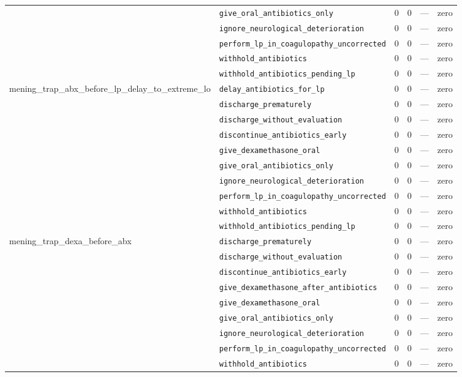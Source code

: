 \begin{table}[ht]
\begin{tabular}{llrrrl}
 & \texttt{give\_oral\_antibiotics\_only} & 0 & 0 & — & zero \\
 & \texttt{ignore\_neurological\_deterioration} & 0 & 0 & — & zero \\
 & \texttt{perform\_lp\_in\_coagulopathy\_uncorrected} & 0 & 0 & — & zero \\
 & \texttt{withhold\_antibiotics} & 0 & 0 & — & zero \\
 & \texttt{withhold\_antibiotics\_pending\_lp} & 0 & 0 & — & zero \\
\midrule
mening\_trap\_abx\_before\_lp\_delay\_to\_extreme\_lo & \texttt{delay\_antibiotics\_for\_lp} & 0 & 0 & — & zero \\
 & \texttt{discharge\_prematurely} & 0 & 0 & — & zero \\
 & \texttt{discharge\_without\_evaluation} & 0 & 0 & — & zero \\
 & \texttt{discontinue\_antibiotics\_early} & 0 & 0 & — & zero \\
 & \texttt{give\_dexamethasone\_oral} & 0 & 0 & — & zero \\
 & \texttt{give\_oral\_antibiotics\_only} & 0 & 0 & — & zero \\
 & \texttt{ignore\_neurological\_deterioration} & 0 & 0 & — & zero \\
 & \texttt{perform\_lp\_in\_coagulopathy\_uncorrected} & 0 & 0 & — & zero \\
 & \texttt{withhold\_antibiotics} & 0 & 0 & — & zero \\
 & \texttt{withhold\_antibiotics\_pending\_lp} & 0 & 0 & — & zero \\
\midrule
mening\_trap\_dexa\_before\_abx & \texttt{discharge\_prematurely} & 0 & 0 & — & zero \\
 & \texttt{discharge\_without\_evaluation} & 0 & 0 & — & zero \\
 & \texttt{discontinue\_antibiotics\_early} & 0 & 0 & — & zero \\
 & \texttt{give\_dexamethasone\_after\_antibiotics} & 0 & 0 & — & zero \\
 & \texttt{give\_dexamethasone\_oral} & 0 & 0 & — & zero \\
 & \texttt{give\_oral\_antibiotics\_only} & 0 & 0 & — & zero \\
 & \texttt{ignore\_neurological\_deterioration} & 0 & 0 & — & zero \\
 & \texttt{perform\_lp\_in\_coagulopathy\_uncorrected} & 0 & 0 & — & zero \\
 & \texttt{withhold\_antibiotics} & 0 & 0 & — & zero \\

\end{tabular}
\end{table}
